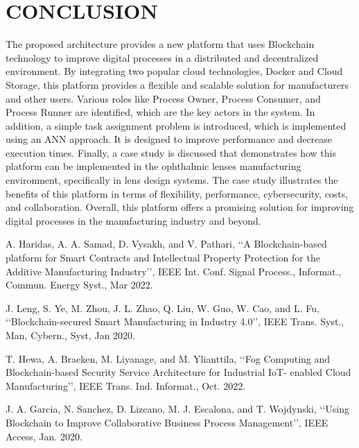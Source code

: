 \documentclass[10pt,a4paper]{report}
\begin{document}
\chapter{	CONCLUSION}

\thispagestyle{fancy}

\large\justify The proposed architecture provides a new platform that uses Blockchain technology to improve digital processes in a distributed and decentralized environment. By integrating two popular cloud technologies, Docker and Cloud Storage, this platform provides a flexible and scalable solution for manufacturers and other users. Various roles like Process Owner, Process Consumer, and Process Runner are identified, which are the key actors in the system. In addition, a simple task assignment problem is introduced, which is implemented using an ANN approach. It is designed to improve performance and decrease execution times. Finally, a case study is discussed that demonstrates how this platform can be implemented in the ophthalmic lenses manufacturing environment, specifically in lens design systems. The case study illustrates the benefits of this platform in terms of flexibility, performance, cybersecurity, costs, and collaboration. Overall, this platform offers a promising solution for improving digital processes in the manufacturing industry and beyond.



\newpage

\setcounter{page}{4}

\begin{thebibliography}{13}
\sloppy
\item{A. Haridas, A. A. Samad, D. Vysakh, and V. Pathari, ‘‘A Blockchain-based platform for Smart Contracts and Intellectual Property Protection for the Additive Manufacturing Industry’’, IEEE Int. Conf. Signal Process., Informat., Commun. Energy Syst., Mar 2022.
}

\sloppy
\item{J. Leng, S. Ye, M. Zhou, J. L. Zhao, Q. Liu, W. Guo, W. Cao, and L. Fu,
‘‘Blockchain-secured Smart Manufacturing in Industry 4.0’’, IEEE Trans. Syst.,
Man, Cybern., Syst, Jan 2020.
}

\sloppy
\item{T. Hewa, A. Braeken, M. Liyanage, and M. Ylianttila, ‘‘Fog Computing and
Blockchain-based Security Service Architecture for Industrial IoT- enabled
Cloud Manufacturing’’, IEEE Trans. Ind. Informat., Oct. 2022.
}

\sloppy
\item{J. A. Garcia, N. Sanchez, D. Lizcano, M. J. Escalona, and T. Wojdynski, ‘‘Using Blockchain to Improve Collaborative Business Process Management’’, IEEE Access, Jan. 2020.
}

\end{thebibliography}
\end{document}
